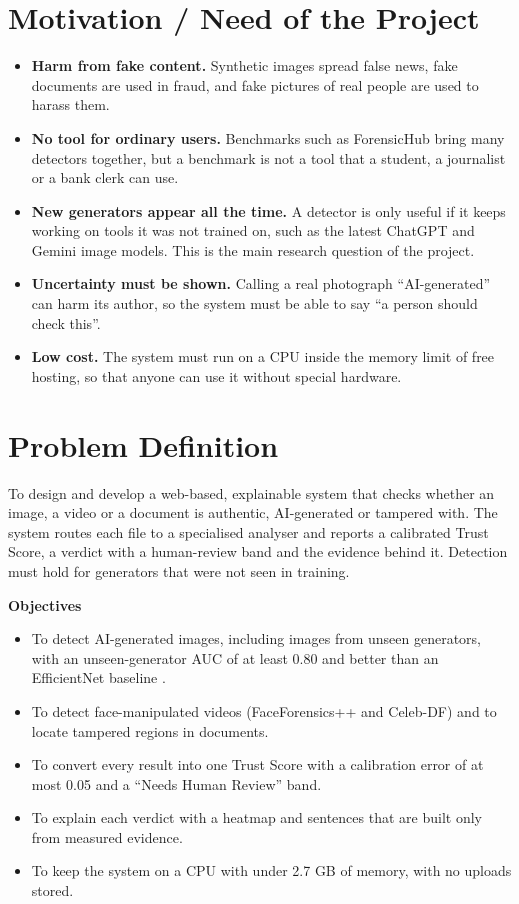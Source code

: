 \documentclass[12pt,a4paper]{article}
\begin{document}
\section{Motivation / Need of the Project}
\begin{itemize}
  \item \textbf{Harm from fake content.} Synthetic images spread false news, fake documents are used in fraud, and fake pictures of real people are used to harass them.
  \item \textbf{No tool for ordinary users.} Benchmarks such as ForensicHub \cite{forensichub} bring many detectors together, but a benchmark is not a tool that a student, a journalist or a bank clerk can use.
  \item \textbf{New generators appear all the time.} A detector is only useful if it keeps working on tools it was not trained on, such as the latest ChatGPT and Gemini image models. This is the main research question of the project.
  \item \textbf{Uncertainty must be shown.} Calling a real photograph ``AI-generated'' can harm its author, so the system must be able to say ``a person should check this''.
  \item \textbf{Low cost.} The system must run on a CPU inside the memory limit of free hosting, so that anyone can use it without special hardware.
\end{itemize}

\section{Problem Definition}
To design and develop a web-based, explainable system that checks whether an image, a video or a document is authentic, AI-generated or tampered with. The system routes each file to a specialised analyser and reports a calibrated Trust Score, a verdict with a human-review band and the evidence behind it. Detection must hold for generators that were not seen in training.

\textbf{Objectives}
\begin{itemize}
  \item To detect AI-generated images, including images from unseen generators, with an unseen-generator AUC of at least 0.80 and better than an EfficientNet baseline \cite{effnet}.
  \item To detect face-manipulated videos (FaceForensics++ and Celeb-DF) and to locate tampered regions in documents.
  \item To convert every result into one Trust Score with a calibration error of at most 0.05 and a ``Needs Human Review'' band.
  \item To explain each verdict with a heatmap and sentences that are built only from measured evidence.
  \item To keep the system on a CPU with under 2.7 GB of memory, with no uploads stored.
\end{itemize}
\end{document}
